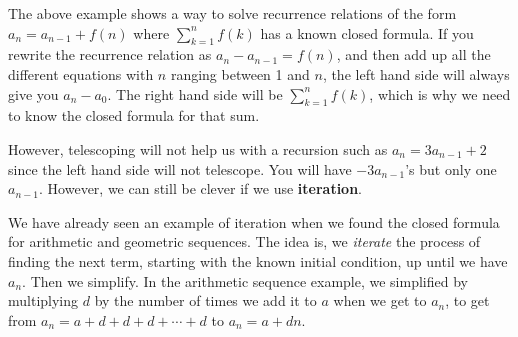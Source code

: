 \documentclass[10pt,]{book}
\newcommand{\terminology}[1]{\textbf{#1}}
\theoremstyle{plain}
\theoremstyle{definition}
\theoremstyle{definition}
\theoremstyle{definition}
\numberwithin{equation}{chapter}
\begin{document}
The above example shows a way to solve recurrence relations of the form \(a_n = a_{n-1} + f(n)\) where \(\sum_{k = 1}^n f(k)\) has a known closed formula. If you rewrite the recurrence relation as \(a_n - a_{n-1} = f(n)\), and then add up all the different equations with \(n\) ranging between 1 and \(n\), the left hand side will always give you \(a_n - a_0\). The right hand side will be \(\sum_{k = 1}^n f(k)\), which is why we need to know the closed formula for that sum.
%
\par

However, telescoping will not help us with a recursion such as \(a_n = 3a_{n-1} + 2\) since the left hand side will not telescope. You will have \(-3a_{n-1}\)'s but only one \(a_{n-1}\). However, we can still be clever if we use \terminology{iteration}.
%
\par

We have already seen an example of iteration when we found the closed formula for arithmetic and geometric sequences. The idea is, we \emph{iterate} the process of finding the next term, starting with the known initial condition, up until we have \(a_n\). Then we simplify. In the arithmetic sequence example, we simplified by multiplying \(d\) by the number of times we add it to \(a\) when we get to \(a_n\), to get from \(a_n = a + d + d + d + \cdots + d\) to \(a_n = a + dn\).
%
\par
\end{document}
